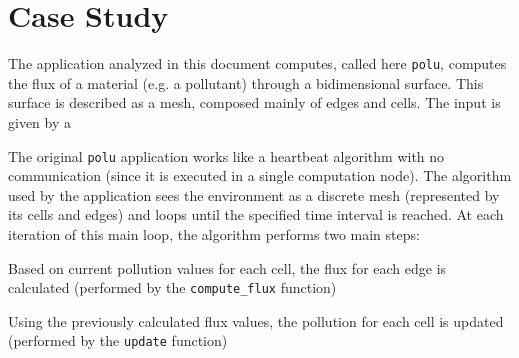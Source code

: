\section{Case Study}

The application analyzed in this document computes, called here \texttt{polu}, computes the flux of a material (e.g. a pollutant) through a bidimensional surface. This surface is described as a mesh, composed mainly of edges and cells. The input is given by a 

The original \texttt{polu} application works like a heartbeat algorithm with no communication (since it is executed in a single computation node). The algorithm used by the application sees the environment as a discrete mesh (represented by its cells and edges) and loops until the specified time interval is reached. At each iteration of this main loop, the algorithm performs two main steps:

\begin{description}
	\item[Flux Computation] Based on current pollution values for each cell, the flux for each edge is calculated (performed by the \texttt{compute\_flux} function)
	\item[Pollution Update] Using the previously calculated flux values, the pollution for each cell is updated (performed by the \texttt{update} function)
\end{description}



